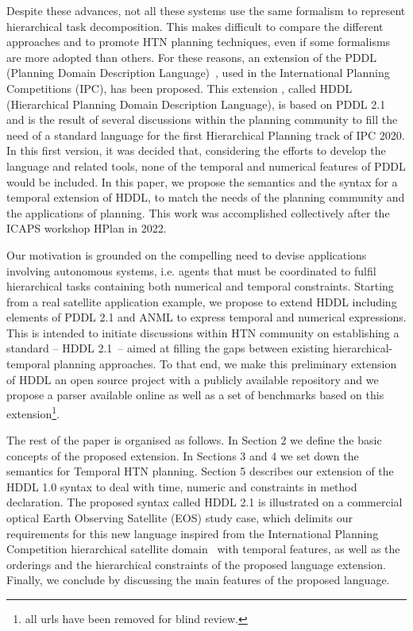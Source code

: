 \documentclass[letterpaper]{article} %
\begin{document}
Despite these advances, not all these systems use the same formalism to represent hierarchical task decomposition. This makes difficult to compare the different approaches and to promote HTN planning techniques, even if some formalisms are more adopted than others. For these reasons, an extension of the PDDL (Planning Domain Description Language)~\citep{mcdermott98},  used in the International Planning Competitions (IPC), has been proposed. This extension \citep{holler20}, called HDDL (Hierarchical Planning Domain Description Language), is based on PDDL 2.1 \citep{fox03} and is the result of several discussions within the planning community \citep{Holler19b} to fill the need of a standard language for the first Hierarchical Planning track of IPC 2020. In this first version, it was decided that, considering the efforts to develop the language and related tools, none of the temporal and numerical features of PDDL would be included. In this paper, we propose the semantics and the syntax for a temporal extension of HDDL, to match the needs of the planning community and the applications of planning. This work was accomplished collectively after the ICAPS workshop HPlan in 2022.

Our motivation is grounded on the compelling need to devise applications involving autonomous systems, i.e. agents that must be coordinated to fulfil hierarchical tasks containing both numerical and temporal constraints.
Starting from a real satellite application example, we propose to extend HDDL including elements of PDDL 2.1 and ANML \citep{smith08} to express temporal and numerical expressions.
This is intended to initiate discussions within HTN community on establishing a standard -- HDDL 2.1~-- aimed at filling the gaps between existing hierarchical-temporal planning approaches. To that end, we make this preliminary extension of HDDL an open source project with a publicly available repository and we propose a parser available online as well as a set of benchmarks based on this extension\footnote{all urls have been removed for blind review.}.

The rest of the paper is organised as follows. In Section 2 we define the basic concepts of the proposed extension. In Sections 3 and 4 we set down the semantics for Temporal HTN planning. Section 5 describes our extension of the HDDL 1.0 syntax to deal with time, numeric and constraints in method declaration. The proposed syntax called HDDL 2.1 is illustrated on a commercial optical Earth Observing Satellite (EOS) study case, which delimits our requirements for this new language inspired from the International Planning Competition hierarchical satellite domain~\citep{schattenberg2020} with temporal features, as well as the orderings and the hierarchical constraints of the proposed language extension. Finally, we conclude by discussing the main features of the proposed language. %
\end{document}
